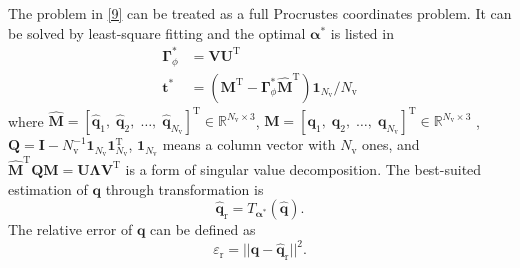 \documentclass{IEEEtran}
\begin{document}
The problem in \eqref{9} can be treated as a full Procrustes coordinates problem. It can be solved by least-square fitting and the optimal $\boldsymbol{\alpha}^*$ is listed in \cite{AruHuaBlo:J87}
\begin{equation}
\begin{aligned}
\boldsymbol{\Gamma}_{\phi}^*&=\mathbf{V}\mathbf{U}^\text{T}\\
\mathbf{t}^*&=(\mathbf{M}^\text{T}-\boldsymbol{\Gamma}_{\phi}^*\hat{\mathbf{M}}^\text{T})\mathbf{1}_{N_{\text{v}}}/N_{\text{v}}
\end{aligned}
\end{equation}
where $\hat{\mathbf{M}}=[\hat{\mathbf{q}}_{1} , \; \hat{\mathbf{q}}_{2} , \; \dots, \;   \hat{\mathbf{q}}_{N_{\text{v}}}]^{\text{T}} \in \mathbb{R}^{N_{\text{v}}\times 3}$,
$\mathbf{M}=[\mathbf{q}_{1}, \; \mathbf{q}_{2}, \; \dots, \;  \mathbf{q}_{N_{\text{v}}}]^{\text{T}}\in \mathbb{R}^{N_{\text{v}}\times 3}$ , $\mathbf{Q}=\mathbf{I}-N_{\text{v}}^{-1}\mathbf{1}_{N_{\text{v}}}\mathbf{1}_{N_{\text{v}}}^\text{T}$, $\mathbf{1}_{N_{\text{v}}}$
means a column vector with $N_{\text{v}}$ ones, and $\hat{\mathbf{M}}^\text{T}\mathbf{Q}\mathbf{M}=\mathbf{U}\boldsymbol{\Lambda}\mathbf{V}^\text{T}$ is a form of singular value decomposition.
The best-suited estimation of $\mathbf{q}$ through transformation is
\begin{equation}
\hat{\mathbf{q}}_{\text{r}}=T_{\boldsymbol{\alpha}^*}
(\hat{\mathbf{q}}).
\end{equation}
The relative error of $\mathbf{q}$ can be defined as
\begin{equation}
\varepsilon_{\text{r}}=||\mathbf{q}-\hat{\mathbf{q}}_{\text{r}}||^2.
\end{equation}
\end{document}

